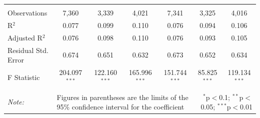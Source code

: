 \documentclass[alpha-refs]{wiley-article-01g}
\begin{document}
\begin{landscape}
\begin{table}[!htbp]
\begin{tabular}{@{\extracolsep{5pt}}lcccccc}
  & & & & & & \\ 
\hline \\[-3ex] 
Observations & 7,360 & 3,339 & 4,021 & 7,341 & 3,325 & 4,016 \\ 
R$^{2}$ & 0.077 & 0.099 & 0.110 & 0.076 & 0.094 & 0.106 \\ 
Adjusted R$^{2}$ & 0.076 & 0.098 & 0.110 & 0.076 & 0.093 & 0.105 \\ 
Residual Std. Error & 0.674 & 0.651 & 0.632 & 0.673 & 0.652 & 0.634 \\ 
F Statistic & 204.097$^{***}$ & 122.160$^{***}$ & 165.996$^{***}$ & 151.744$^{***}$ & 85.825$^{***}$ & 119.134$^{***}$ \\ 
\hline 
\hline \\[-3ex] 
\textit{Note:} &\multicolumn{4}{l}{Figures in parentheses are the limits of the 95\% confidence interval for the coefficient}  & \multicolumn{2}{r}{$^{*}$p$<$0.1; $^{**}$p$<$0.05; $^{***}$p$<$0.01} \\ 
\end{tabular} 
\end{table} 

\end{landscape}

\newpage
\end{document}
